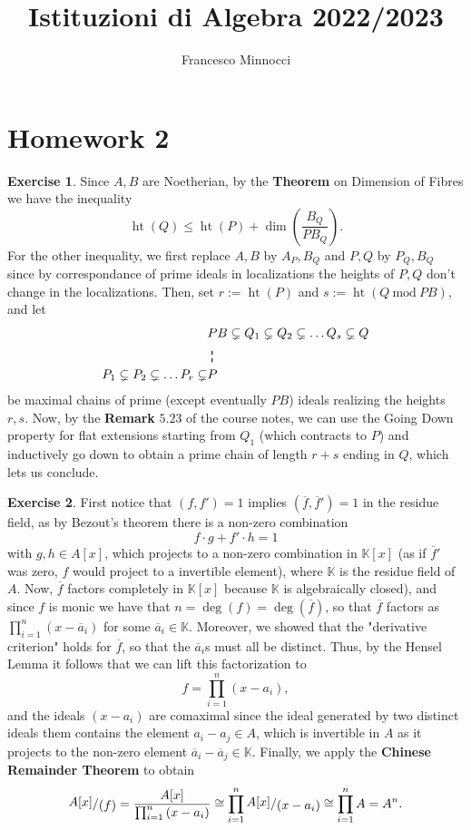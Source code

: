 \documentclass[a4paper]{article}
\title{Istituzioni di Algebra 2022/2023}
\author{Francesco Minnocci}
\newcommand{\K}{\mathbb{K}}
\newcommand{\ssfrac}[2]{
    \raisebox{+0.3ex}{$#1$}
    /
    \raisebox{-0.3ex}{$#2$}
}
\newcommand\vdashline{
  \tikz[baseline]\draw[thick, dashed](0,-\dp\strutbox)--(0,\ht\strutbox);
}
\theoremstyle{definition}
\theoremstyle{definition}
\theoremstyle{remark}
\theoremstyle{definition}
\newtheorem{exercise}{Exercise}[section]
\begin{document}
\maketitle
\section*{Homework 2}
\setcounter{section}{2}
\begin{exercise}
	Since $A,B$ are Noetherian, by the \textbf{Theorem} on Dimension of Fibres we have the inequality $$ \operatorname{ht} \left( Q \right) \leq\operatorname{ht}\left( P \right) +
	\operatorname{dim}\left( \frac{B_Q}{PB_Q} \right)  .$$
	For the other inequality, we first replace $A,B$ by $A_P,B_Q$ and $P,Q$ by $P_Q,B_Q$ since by correspondance of prime ideals in localizations the heights of $P,Q$ don't
	change in the localizations. Then, set $r:=\operatorname{ht} \left( P \right)$ and $ s:=\operatorname{ht} \left( Q~\text{mod}~PB \right)$, and let
	\begin{align*}
		&{PB} \subsetneq Q_1\subsetneq Q_2\subsetneq\dots Q_s\subsetneq Q\\
		&~\vdashline\\
		P_1\subsetneq P_2\subsetneq\dots P_r\subsetneq&P
	\end{align*}
		be maximal chains of prime (except eventually $PB$) ideals realizing the heights $r,s$. Now, by the \textbf{Remark} $5.23$ of the course notes, we can use the Going
		Down property for flat extensions starting from $Q_1$ (which contracts to $P$) and inductively go down to obtain a prime chain of length $r+s$ ending in
		$Q$, which lets us conclude.
\end{exercise}
\begin{exercise}
	First notice that $(f,f')=1$ implies $(\overline{f},\overline{f}')=1$ in the residue field, as by Bezout's theorem there is a non-zero combination $$f\cdot g+f'\cdot
	h=1$$
	with  $g,h\in A[x]$, which projects to a non-zero combination in $\K[x]$ (as if $\overline{f}'$ was zero, $f$ would project to a invertible element), where  $\K$
	is the residue field of $A$. Now, $\overline{f}$ factors completely in $\K[x]$ because $\K$ is algebraically closed), and since $f$ is monic we have that
	$n=\operatorname{deg}(f)=\operatorname{deg}(\overline{f})$, so that $\overline{f}$ factors as $\prod_{i=1}^n{(x-\overline{a}_i)}$ for some $\overline{a}_i\in \K$. Moreover, we showed
that the "derivative criterion" holds for $\overline{f}$, so that the $\overline{a}_i$s must all be distinct. Thus, by the Hensel Lemma it follows that we can lift this
factorization to $$f=\prod_{i=1}^n{(x-a_i)},$$ and the ideals $(x-a_i)$ are comaximal since the ideal generated by two distinct ideals them contains the element $a_i-a_j\in A$, which is
invertible in $A$ as it projects to the non-zero element $\overline{a}_i-\overline{a}_j\in\K$.
Finally, we apply the \textbf{Chinese Remainder Theorem} to obtain $$ \ssfrac{A[x]}{(f)}=\frac{A[x]}{\prod_{i=1}^n{(x-a_i)}}\cong
\prod_{i=1}^n{\ssfrac{A[x]}{(x-a_i)}}\cong\prod_{i=1}^n{A}=A^n.$$
\end{exercise}
\end{document}
